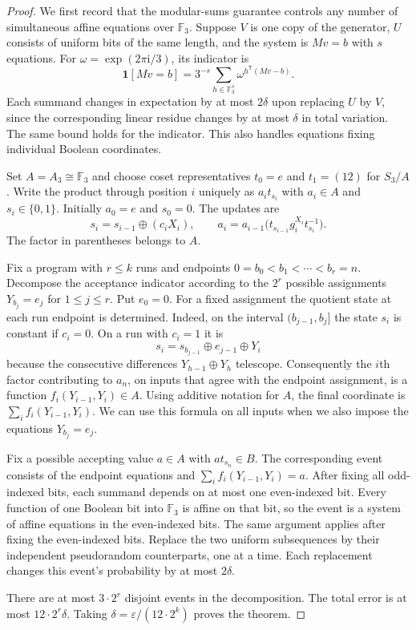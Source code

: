 \documentclass[11pt]{article}
\begin{document}
\begin{proof}
We first record that the modular-sums guarantee controls any number
of simultaneous affine equations over $\mathbb F_3$. Suppose $V$ is
one copy of the generator, $U$ consists of uniform bits of the same
length, and the system is $Mv=b$ with $s$ equations. For
$\omega=\exp(2\pi\mathrm{i}/3)$, its indicator is
\[
    \mathbf{1}[Mv=b]
    =3^{-s}\sum_{h\in\mathbb F_3^s}\omega^{h^{\mathsf T}(Mv-b)}.
\]
Each summand changes in expectation by at most $2\delta$ upon replacing
$U$ by $V$, since the corresponding linear residue changes by at most
$\delta$ in total variation. The same bound holds for the indicator.
This also handles equations fixing individual Boolean coordinates.

Set $A=A_3\cong\mathbb F_3$ and choose coset representatives
$t_0=e$ and $t_1=(12)$ for $S_3/A$. Write the product through position
$i$ uniquely as $a_i t_{s_i}$ with $a_i\in A$ and
$s_i\in\{0,1\}$. Initially $a_0=e$ and $s_0=0$. The updates are
\[
    s_i=s_{i-1}\oplus(c_i X_i),\qquad
    a_i=a_{i-1}\bigl(t_{s_{i-1}}g_i^{X_i}t_{s_i}^{-1}\bigr).
\]
The factor in parentheses belongs to $A$.

Fix a program with $r\le k$ runs and endpoints
$0=b_0<b_1<\cdots<b_r=n$. Decompose the acceptance indicator according
to the $2^r$ possible assignments $Y_{b_j}=e_j$ for $1\le j\le r$.
Put $e_0=0$. For a fixed assignment the quotient state at each run
endpoint is determined. Indeed, on the interval $(b_{j-1},b_j]$
the state $s_i$ is constant if $c_i=0$. On a run with $c_i=1$ it is
\[
    s_i=s_{b_{j-1}}\oplus e_{j-1}\oplus Y_i
\]
because the consecutive differences $Y_{h-1}\oplus Y_h$ telescope.
Consequently the $i$th factor contributing to $a_n$, on inputs that
agree with the endpoint assignment, is a function
$f_i(Y_{i-1},Y_i)\in A$. Using additive notation for $A$, the final
coordinate is $\sum_i f_i(Y_{i-1},Y_i)$. We can use this formula on
all inputs when we also impose the equations $Y_{b_j}=e_j$.

Fix a possible accepting value $a\in A$ with $a t_{s_n}\in B$.
The corresponding event consists of the endpoint equations and
$\sum_i f_i(Y_{i-1},Y_i)=a$. After fixing all odd-indexed bits, each
summand depends on at most one even-indexed bit. Every function of
one Boolean bit into $\mathbb F_3$ is affine on that bit, so the event
is a system of affine equations in the even-indexed bits. The same
argument applies after fixing the even-indexed bits. Replace the two
uniform subsequences by their independent pseudorandom counterparts,
one at a time. Each replacement changes this event's probability by
at most $2\delta$.

There are at most $3\cdot 2^r$ disjoint events in the decomposition.
The total error is at most $12\cdot2^r\delta$. Taking
$\delta=\varepsilon/(12\cdot2^k)$ proves the theorem.
\end{proof}
\end{document}
